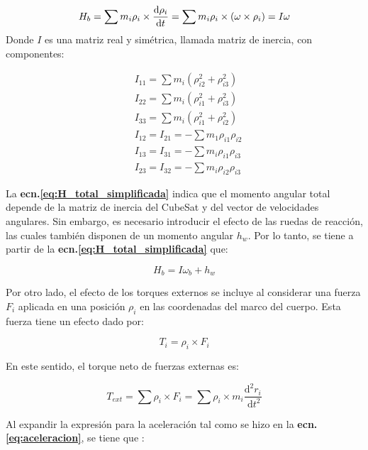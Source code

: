 \begin{equation}\label{eq:H_total_simplificada}
	H_b=\sum m_i\rho_i\times\frac{\mathrm{d} {\rho_i}}{\mathrm{d} t} =
	 \sum m_i\rho_i \times(\omega \times \rho_i) = I\omega \\
\end{equation}
Donde $I$ es una matriz real y simétrica, llamada matriz de inercia, con componentes: 
 
 $$
 \begin{aligned}
 	& I_{11}=\sum m_i\left(\rho_{i 2}^2+\rho_{i 3}^2\right) \\
 	& I_{22}=\sum m_i\left(\rho_{i 1}^2+\rho_{i 3}^2\right) \\
 	& I_{33}=\sum m_i\left(\rho_{i 1}^2+\rho_{i 2}^2\right) \\
 	& I_{12}=I_{21}=-\sum m_1 \rho_{i 1} \rho_{i 2} \\
 	& I_{13}=I_{31}=-\sum m_i \rho_{i 1} \rho_{i 3} \\
 	& I_{23}=I_{32}=-\sum m_i \rho_{i 2} \rho_{i 3}
 \end{aligned}
 $$
 
 La \textbf{ecn.\eqref{eq:H_total_simplificada}} indica que el momento angular total depende de la matriz de inercia del CubeSat y del vector de velocidades angulares. Sin embargo, es necesario introducir el efecto de las ruedas de reacción, las cuales también disponen de un momento angular $h_w$. Por lo tanto, se tiene a partir de la \textbf{ecn.\eqref{eq:H_total_simplificada}} que: 
 
 \begin{equation}\label{eq:H_total_RW}
 	H_b = I\omega_b + h_w
 \end{equation}
 
 Por otro lado, el efecto de los torques externos se incluye al considerar una fuerza $F_i$ aplicada en una posición $\rho_i$ en las coordenadas del marco del cuerpo. Esta fuerza tiene un efecto dado por: 
  
 \begin{equation}
 	T_i=\rho_i \times F_i  
 \end{equation}
 
 
En este sentido, el torque neto de fuerzas externas es:

\begin{equation}
	T_{ext}=\sum \rho_i \times F_i=\sum \rho_i \times m_i \frac{\mathrm{d}^2 r_i}{\mathrm{~d} t^2} 	
\end{equation}
 
 
 Al expandir la expresión para la aceleración tal como se hizo en la \textbf{ecn.\eqref{eq:aceleracion}}, se tiene que :
 
